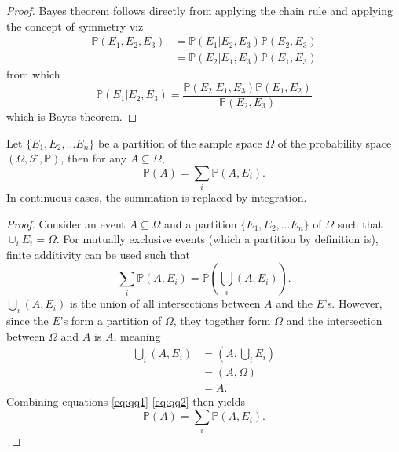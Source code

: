 \begin{proof}
	Bayes theorem follows directly from applying the chain rule and applying the concept of symmetry viz
	\begin{equation}
		\begin{split}
			\mathbb{P}(E_1,E_2,E_3) &= \mathbb{P}(E_1| E_2,E_3)\mathbb{P}(E_2,E_3) \\
			& = \mathbb{P}(E_2|E_1,E_3)\mathbb{P}(E_1,E_3)
		\end{split}
		\label{eq:c2}
	\end{equation}
	from which
	\begin{equation}
		\mathbb{P}(E_1| E_2,E_3) = \frac{\mathbb{P}(E_2| E_1,E_3)\mathbb{P}(E_1,E_2)}{\mathbb{P}(E_2,E_3)}
	\end{equation}
	which is Bayes theorem.
\end{proof}


\begin{theorem}
	\label{theorem:law_of_total_probability}
	Let $\{E_1,E_2,\dots E_n\}$ be a partition of the sample space $\Omega$ of the probability space $(\Omega, \mathcal{F}, \mathbb{P})$, then for any $A\subseteq \Omega$,
	\begin{equation}
		\mathbb{P}(A) = \sum_{i} \mathbb{P}(A,E_i).
		\label{eq:marg}
	\end{equation}
	In continuous cases, the summation is replaced by integration.
\end{theorem}

\begin{proof}
	Consider an event $A\subseteq \Omega$ and a partition $\{E_1,E_2,\dots E_n\}$ of $\Omega$ such that $\cup_{i}E_i=\Omega$. For mutually exclusive events (which a partition by definition is), finite additivity can be used such that
	\begin{equation}
		\sum_{i}\mathbb{P}(A,E_i) = \mathbb{P}(\bigcup_{i}(A,E_i)).
		\label{eq:qq1}
	\end{equation} 
	$\bigcup_{i}(A,E_i)$ is the union of all intersections between $A$ and the $E$'s. However, since the $E$'s form a partition of $\Omega$, they together form $\Omega$ and the intersection between $\Omega$ and $A$ is $A$, meaning
	\begin{equation}
		\begin{split}
			\bigcup_{i}(A,E_i)  &= (A,\bigcup_{i}E_i)\\
			&= (A,\Omega)\\
			& =A.
		\end{split}
	\label{eq:qq2}
	\end{equation}
	Combining equations \eqref{eq:qq1}-\eqref{eq:qq2} then yields
	\begin{equation}
		\mathbb{P}(A) = \sum_{i} \mathbb{P}(A, E_i).
	\end{equation}
	
\end{proof}

